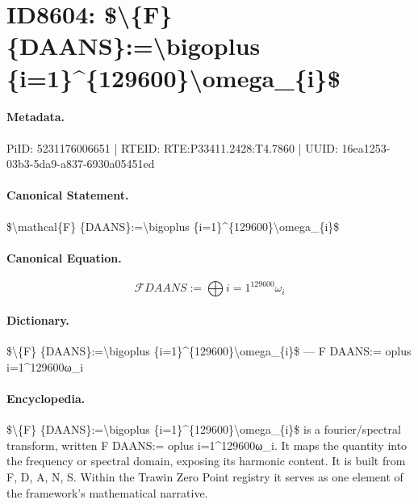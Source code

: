 \section*{ID8604: \$\textbackslash{}\{F\} \{DAANS\}:=\textbackslash{}bigoplus \{i=1\}\textasciicircum{}\{129600\}\textbackslash{}omega\_\{i\}\$}
\paragraph{Metadata.}
PiID: 5231176006651 | RTEID: RTE:P33411.2428:T4.7860 | UUID: 16ea1253-03b3-5da9-a837-6930a05451ed

\paragraph{Canonical Statement.}
\$\textbackslash{}mathcal\{F\} \{DAANS\}:=\textbackslash{}bigoplus \{i=1\}\textasciicircum{}\{129600\}\textbackslash{}omega\_\{i\}\$

\paragraph{Canonical Equation.}
\[
\mathcal{F} {DAANS}:=\bigoplus {i=1}^{129600}\omega_{i}
\]

\paragraph{Dictionary.}
\$\textbackslash{}\{F\} \{DAANS\}:=\textbackslash{}bigoplus \{i=1\}\textasciicircum{}\{129600\}\textbackslash{}omega\_\{i\}\$ — F DAANS:= oplus i=1\textasciicircum{}129600ω\_i

\paragraph{Encyclopedia.}
\$\textbackslash{}\{F\} \{DAANS\}:=\textbackslash{}bigoplus \{i=1\}\textasciicircum{}\{129600\}\textbackslash{}omega\_\{i\}\$ is a fourier/spectral transform, written F DAANS:= oplus i=1\textasciicircum{}129600ω\_i. It maps the quantity into the frequency or spectral domain, exposing its harmonic content. It is built from F, D, A, N, S. Within the Trawin Zero Point registry it serves as one element of the framework's mathematical narrative.
